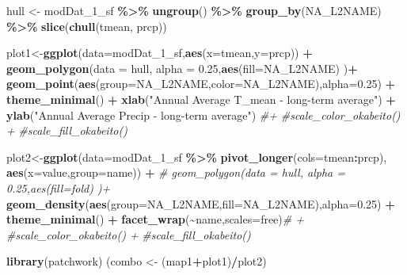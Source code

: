 \documentclass[
]{article}
\newenvironment{Shaded}{\begin{snugshade}}{\end{snugshade}}
\newcommand{\AttributeTok}[1]{\textcolor[rgb]{0.13,0.29,0.53}{#1}}
\newcommand{\CommentTok}[1]{\textcolor[rgb]{0.56,0.35,0.01}{\textit{#1}}}
\newcommand{\FloatTok}[1]{\textcolor[rgb]{0.00,0.00,0.81}{#1}}
\newcommand{\FunctionTok}[1]{\textcolor[rgb]{0.13,0.29,0.53}{\textbf{#1}}}
\newcommand{\NormalTok}[1]{#1}
\newcommand{\OtherTok}[1]{\textcolor[rgb]{0.56,0.35,0.01}{#1}}
\newcommand{\SpecialCharTok}[1]{\textcolor[rgb]{0.81,0.36,0.00}{\textbf{#1}}}
\newcommand{\StringTok}[1]{\textcolor[rgb]{0.31,0.60,0.02}{#1}}
\begin{document}
\begin{Shaded}
\begin{Highlighting}[]
\NormalTok{hull }\OtherTok{\textless{}{-}}\NormalTok{ modDat\_1\_sf }\SpecialCharTok{\%\textgreater{}\%}
  \FunctionTok{ungroup}\NormalTok{() }\SpecialCharTok{\%\textgreater{}\%}
  \FunctionTok{group\_by}\NormalTok{(NA\_L2NAME) }\SpecialCharTok{\%\textgreater{}\%}
  \FunctionTok{slice}\NormalTok{(}\FunctionTok{chull}\NormalTok{(tmean, prcp))}

\NormalTok{plot1}\OtherTok{\textless{}{-}}\FunctionTok{ggplot}\NormalTok{(}\AttributeTok{data=}\NormalTok{modDat\_1\_sf,}\FunctionTok{aes}\NormalTok{(}\AttributeTok{x=}\NormalTok{tmean,}\AttributeTok{y=}\NormalTok{prcp)) }\SpecialCharTok{+}
  \FunctionTok{geom\_polygon}\NormalTok{(}\AttributeTok{data =}\NormalTok{ hull, }\AttributeTok{alpha =} \FloatTok{0.25}\NormalTok{,}\FunctionTok{aes}\NormalTok{(}\AttributeTok{fill=}\NormalTok{NA\_L2NAME) )}\SpecialCharTok{+}
  \FunctionTok{geom\_point}\NormalTok{(}\FunctionTok{aes}\NormalTok{(}\AttributeTok{group=}\NormalTok{NA\_L2NAME,}\AttributeTok{color=}\NormalTok{NA\_L2NAME),}\AttributeTok{alpha=}\FloatTok{0.25}\NormalTok{) }\SpecialCharTok{+}
  \FunctionTok{theme\_minimal}\NormalTok{() }\SpecialCharTok{+} \FunctionTok{xlab}\NormalTok{(}\StringTok{"Annual Average T\_mean {-} long{-}term average"}\NormalTok{) }\SpecialCharTok{+}
  \FunctionTok{ylab}\NormalTok{(}\StringTok{"Annual Average Precip {-} long{-}term average"}\NormalTok{) }\CommentTok{\#+}
  \CommentTok{\#scale\_color\_okabeito() +}
  \CommentTok{\#scale\_fill\_okabeito()}

\NormalTok{plot2}\OtherTok{\textless{}{-}}\FunctionTok{ggplot}\NormalTok{(}\AttributeTok{data=}\NormalTok{modDat\_1\_sf }\SpecialCharTok{\%\textgreater{}\%}
                \FunctionTok{pivot\_longer}\NormalTok{(}\AttributeTok{cols=}\NormalTok{tmean}\SpecialCharTok{:}\NormalTok{prcp),}
              \FunctionTok{aes}\NormalTok{(}\AttributeTok{x=}\NormalTok{value,}\AttributeTok{group=}\NormalTok{name)) }\SpecialCharTok{+}
  \CommentTok{\# geom\_polygon(data = hull, alpha = 0.25,aes(fill=fold) )+}
  \FunctionTok{geom\_density}\NormalTok{(}\FunctionTok{aes}\NormalTok{(}\AttributeTok{group=}\NormalTok{NA\_L2NAME,}\AttributeTok{fill=}\NormalTok{NA\_L2NAME),}\AttributeTok{alpha=}\FloatTok{0.25}\NormalTok{) }\SpecialCharTok{+}
  \FunctionTok{theme\_minimal}\NormalTok{() }\SpecialCharTok{+}
  \FunctionTok{facet\_wrap}\NormalTok{(}\SpecialCharTok{\textasciitilde{}}\NormalTok{name,}\AttributeTok{scales=}\StringTok{\textquotesingle{}free\textquotesingle{}}\NormalTok{)}\CommentTok{\# +}
  \CommentTok{\#scale\_color\_okabeito() +}
  \CommentTok{\#scale\_fill\_okabeito()}
 
\FunctionTok{library}\NormalTok{(patchwork)}
\NormalTok{(combo }\OtherTok{\textless{}{-}}\NormalTok{ (map1}\SpecialCharTok{+}\NormalTok{plot1)}\SpecialCharTok{/}\NormalTok{plot2) }
\end{Highlighting}
\end{Shaded}
\end{document}
